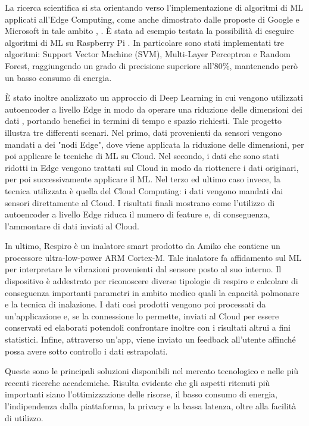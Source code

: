 La ricerca scientifica si sta orientando verso l'implementazione di algoritmi di ML applicati all'Edge Computing, come anche dimostrato dalle proposte di Google e Microsoft in tale ambito \cite{tflowres}, \cite{edgemlres}.
È stata ad esempio testata la possibilità di eseguire algoritmi di ML su Raspberry Pi \cite{mlrasp}. In particolare sono stati implementati tre algoritmi: Support Vector Machine (SVM), Multi-Layer Perceptron e Random Forest, raggiungendo un grado di precisione superiore all'80\%, mantenendo però un basso consumo di energia.

È stato inoltre analizzato un approccio di Deep Learning in cui vengono utilizzati autoencoder a livello Edge in modo da operare una riduzione delle dimensioni dei dati \cite{encoder}, portando benefici in termini di tempo e spazio richiesti. Tale progetto illustra tre differenti scenari. Nel primo, dati provenienti da sensori vengono mandati a dei "nodi Edge", dove viene applicata la riduzione delle dimensioni, per poi applicare le tecniche di ML su Cloud. Nel secondo, i dati che sono stati ridotti in Edge vengono trattati sul Cloud in modo da riottenere i dati originari, per poi successivamente applicare il ML. Nel terzo ed ultimo caso invece, la tecnica utilizzata è quella del Cloud Computing: i dati vengono mandati dai sensori direttamente al Cloud. I risultati finali mostrano come l'utilizzo di autoencoder a livello Edge riduca il numero di feature e, di conseguenza, l'ammontare di dati inviati al Cloud.

In ultimo, Respiro è un inalatore smart prodotto da Amiko \cite{respiro} che contiene un processore ultra-low-power ARM Cortex-M. Tale inalatore fa affidamento sul ML per interpretare le vibrazioni provenienti dal sensore posto al suo interno. Il dispositivo è addestrato per riconoscere diverse tipologie di respiro e calcolare di conseguenza importanti parametri in ambito medico quali la capacità polmonare e la tecnica di inalazione. I dati così prodotti vengono poi processati da un'applicazione e, se la connessione lo permette, inviati al Cloud per essere conservati ed elaborati potendoli confrontare inoltre con i risultati altrui a fini statistici. Infine, attraverso un'app, viene inviato un feedback all'utente affinché possa avere sotto controllo i dati estrapolati.

Queste sono le principali soluzioni disponibili nel mercato tecnologico e nelle più recenti ricerche accademiche. Risulta evidente che gli aspetti ritenuti più importanti siano l'ottimizzazione delle risorse, il basso consumo di energia, l'indipendenza dalla piattaforma, la privacy e la bassa latenza, oltre alla facilità di utilizzo.

